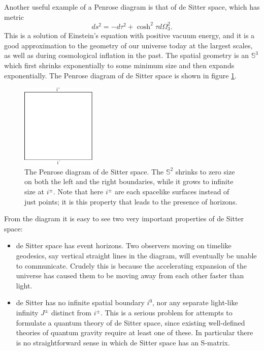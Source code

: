 \documentclass[12pt]{article}
\newcommand{\be}{\begin{equation}}
\newcommand{\ee}{\end{equation}}
\begin{document}
Another useful example of a Penrose diagram is that of de Sitter space, which has metric
\be
ds^2=-d\tau^2+\cosh^2\tau d\Omega_3^2.
\ee
This is a solution of Einstein's equation with positive vacuum energy, and it is a good approximation to the geometry of our universe today at the largest scales, as well as during cosmological inflation in the past.  The spatial geometry is an $\mathbb{S}^3$ which first shrinks exponentially to some minimum size and then expands exponentially.  The Penrose diagram of de Sitter space is shown in figure \ref{dspenrose}.  
\begin{figure}
\begin{center}
\includegraphics[height=4cm]{dspenrose.pdf}
\caption{The Penrose diagram of de Sitter space.  The $\mathbb{S}^2$ shrinks to zero size on both the left and the right boundaries, while it grows to infinite size at $i^{\pm}$.  Note that here $i^\pm$ are each spacelike surfaces instead of just points; it is this property that leads to the presence of horizons.}\label{dspenrose}
\end{center}
\end{figure}
From the diagram it is easy to see two very important properties of de Sitter space:
\begin{itemize}
\item de Sitter space has event horizons.  Two observers moving on timelike geodesics, say vertical straight lines in the diagram, will eventually be unable to communicate.  Crudely this is because the accelerating expansion of the universe has caused them to be moving away from each other faster than light.  
\item de Sitter has no infinite spatial boundary $i^0$, nor any separate light-like infinity $J^\pm$ distinct from $i^\pm$.  This is a serious problem for attempts to formulate a quantum theory of de Sitter space, since existing well-defined theories of quantum gravity require at least one of these.  In particular there is no straightforward sense in which de Sitter space has an S-matrix.  
\end{itemize}
\end{document}
